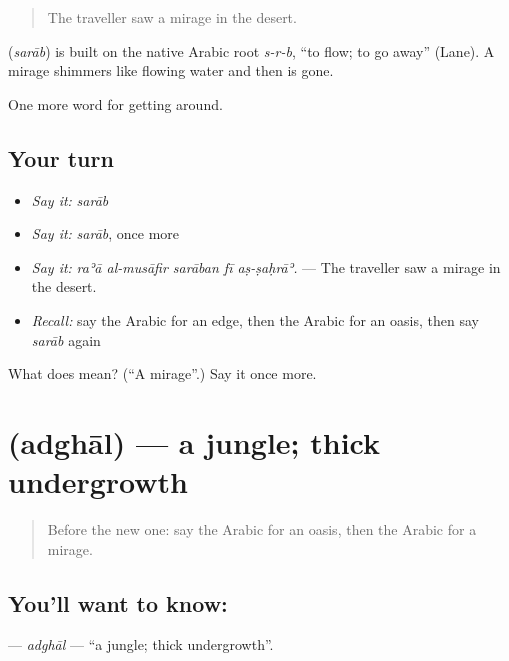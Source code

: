 \begin{quote}
The traveller saw a mirage in the desert.
\end{quote}

\begin{cousinweb}
\textbf{} (\emph{sarāb}) is built on the native Arabic root \emph{s-r-b}, \textquotedblleft{}to flow; to go away\textquotedblright{} (Lane). A mirage shimmers like flowing water and then is gone.
\end{cousinweb}

\begin{grammarlens}[title={What you've built}]
One more word for getting around.
\end{grammarlens}

\subsection*{Your turn}
\begin{itemize}
\raggedright
  \item \emph{Say it:} \emph{sarāb}
  \item \emph{Say it:} \emph{sarāb}, once more
  \item \emph{Say it:} \emph{raʾā al-musāfir sarāban fī aṣ-ṣaḥrāʾ.} — The traveller saw a mirage in the desert.
  \item \emph{Recall:} say the Arabic for an edge, then the Arabic for an oasis, then say \emph{sarāb} again
\end{itemize}

\begin{tcolorbox}[breakable,colback=teal!4,colframe=teal!35!black,title={Before you move on}]
What does  mean? (\textquotedblleft{}A mirage\textquotedblright{}.) Say it once more.
\end{tcolorbox}
\section[\texorpdfstring{\ar{أدغال} (adghāl)}{أدغال (adghāl)}]{ (adghāl) — a jungle; thick undergrowth}

\label{lesson:AR-C473-adghal}



\begin{quote}
Before the new one: say the Arabic for an oasis, then the Arabic for a mirage.
\end{quote}

\subsection*{You'll want to know: }
\textbf{} — \emph{adghāl} — \textquotedblleft{}a jungle; thick undergrowth\textquotedblright{}.

